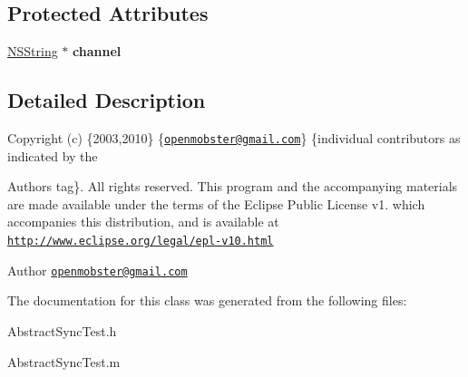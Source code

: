 \subsection*{\-Protected \-Attributes}
\begin{DoxyCompactItemize}
\item 
\hypertarget{interface_abstract_sync_test_a4665b72180425740facd9b64d5906305}{
\hyperlink{class_n_s_string}{\-N\-S\-String} $\ast$ {\bfseries channel}}
\label{interface_abstract_sync_test_a4665b72180425740facd9b64d5906305}

\end{DoxyCompactItemize}


\subsection{\-Detailed \-Description}
\-Copyright (c) \{2003,2010\} \{\href{mailto:openmobster@gmail.com}{\tt openmobster@gmail.\-com}\} \{individual contributors as indicated by the \begin{DoxyAuthor}{\-Authors}
tag\}. \-All rights reserved. \-This program and the accompanying materials are made available under the terms of the \-Eclipse \-Public \-License v1. which accompanies this distribution, and is available at \href{http://www.eclipse.org/legal/epl-v10.html}{\tt http\-://www.\-eclipse.\-org/legal/epl-\/v10.\-html}
\end{DoxyAuthor}
\begin{DoxyAuthor}{\-Author}
\href{mailto:openmobster@gmail.com}{\tt openmobster@gmail.\-com} 
\end{DoxyAuthor}


\-The documentation for this class was generated from the following files\-:\begin{DoxyCompactItemize}
\item 
\-Abstract\-Sync\-Test.\-h\item 
\-Abstract\-Sync\-Test.\-m\end{DoxyCompactItemize}
